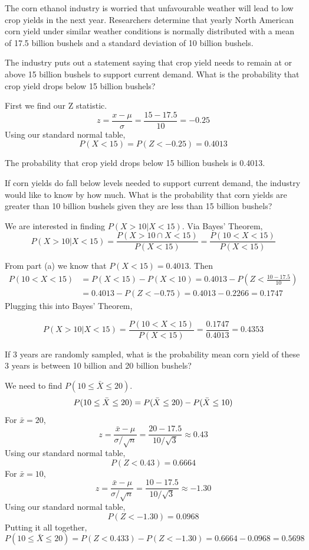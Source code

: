 \begin{example}
The corn ethanol industry is worried that unfavourable weather will lead to low crop yields in the next year. Researchers determine that yearly North American corn yield under similar weather conditions is normally distributed with a mean of 17.5 billion bushels and a standard deviation of 10 billion bushels. 

\begin{benumerate}
\item The industry puts out a statement saying that crop yield needs to remain at or above 15 billion bushels to support current demand. What is the probability that crop yield drops below 15 billion bushels?

First we find our Z statistic.
\[ z = \frac{x - \mu}{\sigma} = \frac{15 - 17.5}{10} = -0.25\]
Using our standard normal table,
\[ P(X < 15) = P(Z < -0.25) = 0.4013 \]

The probability that crop yield drops below 15 billion bushels is 0.4013.

\item If corn yields do fall below levels needed to support current demand, the industry would like to know by how much. What is the probability that corn yields are greater than 10 billion bushels given they are less than 15 billion bushels?

We are interested in finding $P(X>10|X<15)$. Via Bayes' Theorem,
\[ P(X>10|X<15) = \frac{P(X>10 \cap X<15)}{P(X<15)} = \frac{P(10<X<15)}{P(X<15)} \]

From part (a) we know that $P(X<15) = 0.4013$. Then
\begin{align*}
P(10 < X < 15) &= P(X<15) - P(X<10) = 0.4013 - P\left(Z< \frac{10-17.5}{10}\right)\\ & = 0.4013 - P(Z<-0.75) = 0.4013 - 0.2266 =0.1747
\end{align*}
Plugging this into Bayes' Theorem,

\[ P(X>10|X<15) = \frac{P(10<X<15)}{P(X<15)} =\frac{0.1747}{0.4013} = 0.4353\]
\item If 3 years are randomly sampled, what is the probability mean corn yield of these 3 years is between 10 billion and 20 billion bushels?

We need to find $P(10 \leq \bar{X} \leq 20)$.
\begin{equation}
P(10 \leq \bar{X} \leq 20) = P(\bar{X} \leq 20) - P(\bar{X} \leq 10) \\
\end{equation}
For $\bar{x}=20$,
\[ z = \frac{\bar{x}-\mu}{\sigma/ \sqrt{n}} = \frac{20 - 17.5}{10/\sqrt{3}} \approx 0.43 \]
Using our standard normal table,
\[ P(Z < 0.43) = 0.6664 \]
For $\bar{x} = 10$, 
\[ z = \frac{\bar{x}-\mu}{\sigma/ \sqrt{n}} = \frac{10 - 17.5}{10/\sqrt{3}} \approx -1.30 \]
Using our standard normal table,
\[ P(Z < -1.30) = 0.0968 \]
Putting it all together,
\[
P(10 \leq \bar{X} \leq 20) = P(Z < 0.433) - P(Z<-1.30) = 0.6664-0.0968 = 0.5698
\]
\end{benumerate}
\end{example}


